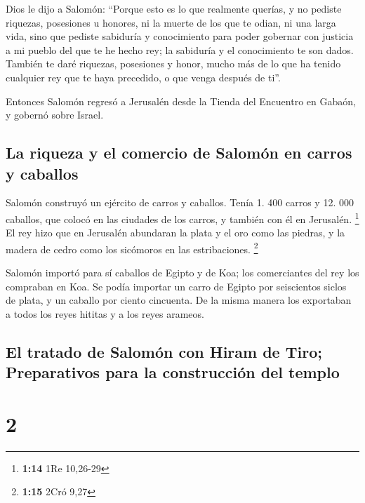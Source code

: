  Dios le dijo a Salomón: ``Porque esto es lo que
realmente querías, y no pediste riquezas, posesiones u honores, ni la
muerte de los que te odian, ni una larga vida, sino que pediste
sabiduría y conocimiento para poder gobernar con justicia a mi pueblo
del que te he hecho rey;  la sabiduría y el conocimiento
te son dados. También te daré riquezas, posesiones y honor, mucho más de
lo que ha tenido cualquier rey que te haya precedido, o que venga
después de ti''.

 Entonces Salomón regresó a Jerusalén desde la Tienda del
Encuentro en Gabaón, y gobernó sobre Israel.

\hypertarget{la-riqueza-y-el-comercio-de-salomuxf3n-en-carros-y-caballos}{%
\subsection{La riqueza y el comercio de Salomón en carros y
caballos}\label{la-riqueza-y-el-comercio-de-salomuxf3n-en-carros-y-caballos}}

 Salomón construyó un ejército de carros y caballos.
Tenía 1. 400 carros y 12. 000 caballos, que colocó en las ciudades de
los carros, y también con él en Jerusalén. \footnote{\textbf{1:14} 1Re
  10,26-29}  El rey hizo que en Jerusalén abundaran la
plata y el oro como las piedras, y la madera de cedro como los sicómoros
en las estribaciones. \footnote{\textbf{1:15} 2Cró 9,27}

 Salomón importó para sí caballos de Egipto y de Koa; los
comerciantes del rey los compraban en Koa.  Se podía
importar un carro de Egipto por seiscientos siclos de plata, y un
caballo por ciento cincuenta. De la misma manera los exportaban a todos
los reyes hititas y a los reyes arameos.

\hypertarget{el-tratado-de-salomuxf3n-con-hiram-de-tiro-preparativos-para-la-construcciuxf3n-del-templo}{%
\subsection{El tratado de Salomón con Hiram de Tiro; Preparativos para
la construcción del
templo}\label{el-tratado-de-salomuxf3n-con-hiram-de-tiro-preparativos-para-la-construcciuxf3n-del-templo}}

\hypertarget{section-1}{%
\section{2}\label{section-1}}

